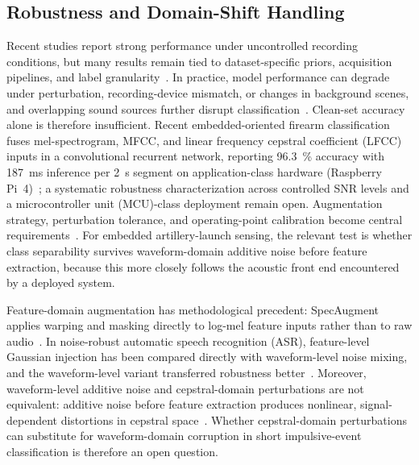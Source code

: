 ﻿\documentclass[conference]{IEEEtran}
\begin{document}
\subsection{Robustness and Domain-Shift Handling}
Recent studies report strong performance under uncontrolled recording conditions, but many results remain tied to dataset-specific priors, acquisition pipelines, and label granularity~\cite{khan2010embedding,raponi2022sound_of_guns,svatos2024fcc}. In practice, model performance can degrade under perturbation, recording-device mismatch, or changes in background scenes, and overlapping sound sources further disrupt classification~\cite{ye2019multi_sound}. Clean-set accuracy alone is therefore insufficient. Recent embedded-oriented firearm classification fuses mel-spectrogram, MFCC, and linear frequency cepstral coefficient (LFCC) inputs in a convolutional recurrent network, reporting 96.3~\% accuracy with 187~ms inference per 2~s segment on application-class hardware (Raspberry Pi~4)~\cite{elkarous2025firearm}; a systematic robustness characterization across controlled SNR levels and a microcontroller unit (MCU)-class deployment remain open. Augmentation strategy, perturbation tolerance, and operating-point calibration become central requirements~\cite{salamon2017esc_aug}. For embedded artillery-launch sensing, the relevant test is whether class separability survives waveform-domain additive noise before feature extraction, because this more closely follows the acoustic front end encountered by a deployed system.

Feature-domain augmentation has methodological precedent: SpecAugment applies warping and masking directly to log-mel feature inputs rather than to raw audio~\cite{park2019specaugment}. In noise-robust automatic speech recognition (ASR), feature-level Gaussian injection has been compared directly with waveform-level noise mixing, and the waveform-level variant transferred robustness better~\cite{braun2017accan}. Moreover, waveform-level additive noise and cepstral-domain perturbations are not equivalent: additive noise before feature extraction produces nonlinear, signal-dependent distortions in cepstral space~\cite{delatorre2002nonlinear_feature_space}. Whether cepstral-domain perturbations can substitute for waveform-domain corruption in short impulsive-event classification is therefore an open question.
\end{document}
